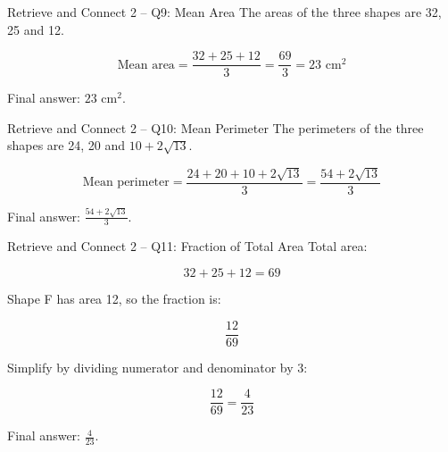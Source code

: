 \documentclass{beamer}
\begin{document}
\begin{frame}{Retrieve and Connect 2 -- Q9: Mean Area}
\small
The areas of the three shapes are 32, 25 and 12.

\[
\text{Mean area}=\frac{32+25+12}{3}=\frac{69}{3}=23\text{ cm}^2
\]

Final answer: \(\boxed{23\text{ cm}^2}\).
\end{frame}

\begin{frame}{Retrieve and Connect 2 -- Q10: Mean Perimeter}
\small
The perimeters of the three shapes are 24, 20 and \(10+2\sqrt{13}\).

\[
\text{Mean perimeter}
=\frac{24+20+10+2\sqrt{13}}{3}
=\frac{54+2\sqrt{13}}{3}
\]

Final answer: \(\boxed{\frac{54+2\sqrt{13}}{3}}\).
\end{frame}

\begin{frame}{Retrieve and Connect 2 -- Q11: Fraction of Total Area}
\small
Total area:

\[
32+25+12=69
\]

Shape F has area 12, so the fraction is:

\[
\frac{12}{69}
\]

Simplify by dividing numerator and denominator by 3:

\[
\frac{12}{69}=\frac{4}{23}
\]

Final answer: \(\boxed{\frac{4}{23}}\).
\end{frame}
\end{document}
